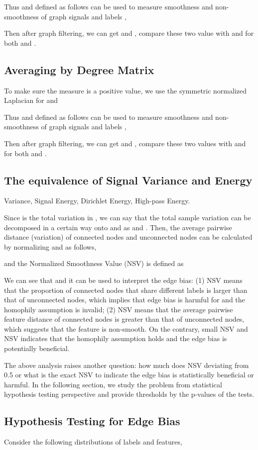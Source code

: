 \documentclass{article}
\newcommand{\0}{{\boldsymbol{0}}}
\newcommand{\6}{{\partial}}
\newcommand{\8}{{\infty}}
\newcommand{\4}{{\nabla}}
\begin{document}
Thus  and  defined as follows can be used to measure smoothness and non-smoothness of graph signals and labels ,

Then after graph filtering, we can get  and , compare these two value with  and  for both  and .

\subsection{Averaging by Degree Matrix}
To make sure the measure is a positive value, we use the symmetric normalized Laplacian for  and 


Thus  and  defined as follows can be used to measure smoothness and non-smoothness of graph signals and labels ,

Then after graph filtering, we can get  and , compare these two values with  and  for both  and .
\subsection{The equivalence of Signal Variance and Energy}
Variance, Signal Energy, Dirichlet Energy, High-pass Energy.

Since  is the total variation in , we can say that the total sample variation can be decomposed in a certain way onto  and  as  and . Then, the average pairwise distance (variation) of connected nodes and unconnected nodes can be calculated by normalizing  and  as follows,

and the Normalized Smoothness Value (NSV) is defined as

We can see that  and it can be used to interpret the edge bias: (1) NSV means that the proportion of connected nodes that share different labels is larger than that of unconnected nodes, which implies that edge bias is harmful for  and the homophily assumption is invalid; (2) NSV means that the average pairwise feature distance of connected nodes is greater than that of unconnected nodes, which suggests that the feature is non-smooth. On the contrary, small NSV and NSV indicates that the homophily assumption holds and the edge bias is potentially beneficial.

The above analysis raises another question: how much does NSV deviating from 0.5 or what is the exact NSV to indicate the edge bias is statistically beneficial or harmful. In the following section, we study the problem from statistical hypothesis testing perspective and provide thresholds by the p-values of the tests.
\subsection{Hypothesis Testing for Edge Bias}
Consider the following distributions of labels and features,
\end{document}
